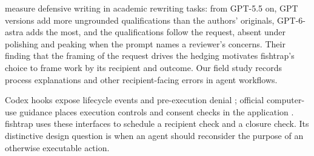 \citet{liao2026defensive} measure defensive writing in academic rewriting tasks: from GPT-5.5 on, GPT versions add more ungrounded qualifications than the authors' originals, GPT-6-astra adds the most, and the qualifications follow the request, absent under polishing and peaking when the prompt names a reviewer's concerns. Their finding that the framing of the request drives the hedging motivates fishtrap's choice to frame work by its recipient and outcome. Our field study records process explanations and other recipient-facing errors in agent workflows.

Codex hooks expose lifecycle events and pre-execution denial \citep{openai2026hooks}; official computer-use guidance places execution controls and consent checks in the application \citep{openai2026computeruse}. fishtrap uses these interfaces to schedule a recipient check and a closure check. Its distinctive design question is when an agent should reconsider the purpose of an otherwise executable action.
